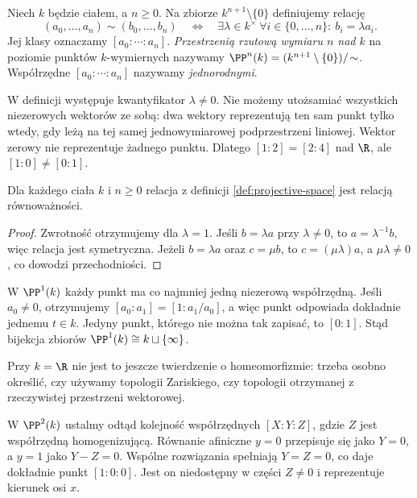 \begin{definicja}
\label{def:projective-space}
Niech $k$ będzie ciałem, a $n\ge0$. Na zbiorze
$k^{n+1}\setminus\{0\}$ definiujemy relację
\[
 (a_0,\ldots,a_n)\sim(b_0,\ldots,b_n)
 \quad\Longleftrightarrow\quad
 \exists\lambda\in k^\times\ \forall i\in\{0,\ldots,n\}:\ b_i=\lambda a_i.
\]
Jej klasy oznaczamy $[a_0:\cdots:a_n]$. \emph{Przestrzenią
rzutową wymiaru $n$ nad $k$} na poziomie punktów $k$-wymiernych
nazywamy $\PP^n(k)=(k^{n+1}\setminus\{0\})/\!\sim$.
Współrzędne $[a_0:\cdots:a_n]$ nazywamy \emph{jednorodnymi}.
\end{definicja}

W definicji występuje kwantyfikator $\lambda\ne0$. Nie możemy
utożsamiać wszystkich niezerowych wektorów ze sobą: dwa wektory
reprezentują ten sam punkt tylko wtedy, gdy leżą na tej samej
jednowymiarowej podprzestrzeni liniowej. Wektor zerowy nie reprezentuje
żadnego punktu. Dlatego $[1:2]=[2:4]$ nad $\R$, ale $[1:0]\ne[0:1]$.

\begin{stwierdzenie}
Dla każdego ciała $k$ i $n\ge0$ relacja z definicji
\ref{def:projective-space} jest relacją równoważności.
\end{stwierdzenie}
\begin{proof}
Zwrotność otrzymujemy dla $\lambda=1$. Jeśli $b=\lambda a$
przy $\lambda\ne0$, to $a=\lambda^{-1}b$, więc relacja jest
symetryczna. Jeżeli $b=\lambda a$ oraz $c=\mu b$, to
$c=(\mu\lambda)a$, a $\mu\lambda\ne0$, co dowodzi
przechodniości.
\end{proof}

\begin{przyklad}
W $\PP^1(k)$ każdy punkt ma co najmniej jedną niezerową
współrzędną. Jeśli $a_0\ne0$, otrzymujemy
$[a_0:a_1]=[1:a_1/a_0]$, a więc punkt odpowiada dokładnie
jednemu $t\in k$. Jedyny punkt, którego nie można tak zapisać,
to $[0:1]$. Stąd bijekcja zbiorów
$\PP^1(k)\cong k\sqcup\{\infty\}$.

Przy $k=\R$ nie jest to jeszcze twierdzenie o homeomorfizmie:
trzeba osobno określić, czy używamy topologii Zariskiego,
czy topologii otrzymanej z rzeczywistej przestrzeni wektorowej.
\end{przyklad}

\begin{przyklad}
W $\PP^2(k)$ ustalmy odtąd kolejność współrzędnych
$[X:Y:Z]$, gdzie $Z$ jest współrzędną homogenizującą.
Równanie afiniczne $y=0$ przepisuje się jako $Y=0$,
a $y=1$ jako $Y-Z=0$. Wspólne rozwiązania spełniają
$Y=Z=0$, co daje dokładnie punkt $[1:0:0]$.
Jest on niedostępny w części $Z\ne0$ i reprezentuje kierunek
osi $x$.
\end{przyklad}

